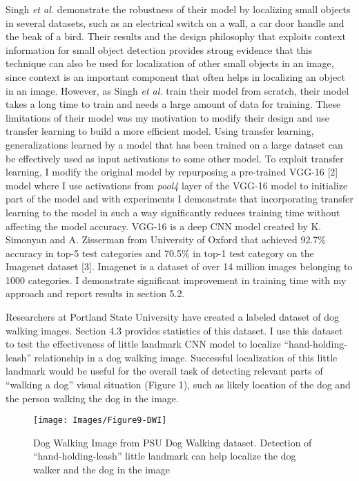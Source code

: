 \documentclass [11pt,letterpaper ,twoside ,openany ]{report}
\begin{document}
    Singh \textit {et al.} demonstrate the robustness of their model by localizing small objects in several datasets, such as an electrical switch on a wall, a car door handle and the beak of a bird. Their results and the design philosophy that exploits context information for small object detection provides strong evidence that this technique can also be used for localization of other small objects in an image, since context is an important component that often helps in localizing an object in an image. However, as Singh \textit{et al.} train their model from scratch, their model takes a long time to train and needs a large amount of data for training. These limitations of their model was my motivation to modify their design and use transfer learning to build a more efficient model. Using transfer learning, generalizations learned by a model that has been trained on a large dataset can be effectively used as input activations to some other model. To exploit transfer learning, I modify the original model by repurposing a pre-trained VGG-16 [2] model where I use activations from \textit{pool4} layer of the VGG-16 model to initialize part of the model and with experiments I demonstrate that incorporating  transfer learning to the model in such a way significantly reduces training time without affecting the model accuracy. VGG-16 is a deep CNN model created by K. Simonyan and A. Zisserman from University of Oxford that achieved 92.7\% accuracy in top-5 test categories and 70.5\% in top-1 test category on the Imagenet dataset [3]. Imagenet is a dataset of over 14 million images belonging to 1000 categories. I demonstrate significant improvement in training time with my approach and report results in section 5.2.

    Researchers at Portland State University have created a labeled dataset of dog walking images. Section 4.3 provides statistics of this dataset. I use this dataset to test the effectiveness of little landmark CNN model to localize ``hand-holding-leash'' relationship in a dog walking image. Successful localization of this little landmark would be useful for the overall task of detecting relevant parts of ``walking a dog'' visual situation (Figure 1), such as likely location of the dog and the person walking the dog in the image.

    \begin{wrapfigure}{l}[9mm]{0.5\textwidth}
        \begin{center}
            \texttt{[image: Images/Figure9-DWI]}
        \end{center}
        \caption{Dog Walking Image from PSU Dog Walking dataset. Detection of ``hand-holding-leash'' little landmark can help localize the dog walker and the dog in the image}
    \end{wrapfigure}    
\end{document}
